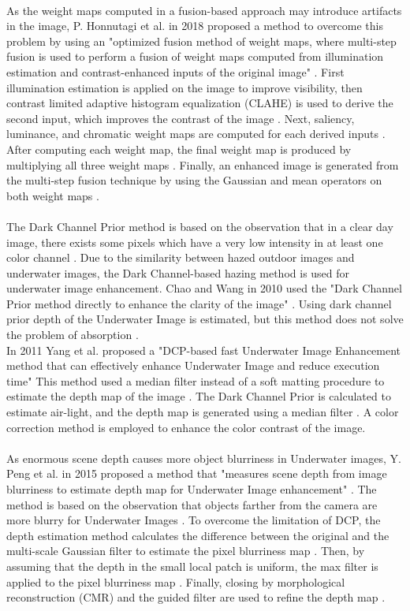 \documentclass[a4paper,11pt,oneside]{article}
\begin{document}
  \\
  As the weight maps computed in a fusion-based approach may introduce artifacts in the image, P. Honnutagi et al. in 2018 \cite{10} proposed a method to overcome this problem by using an "optimized fusion method of weight maps, where multi-step fusion is used to perform a fusion of weight maps computed from illumination estimation and contrast-enhanced inputs of the original image" \cite{10}. First illumination estimation is applied on the image to improve visibility, then contrast limited adaptive histogram equalization (CLAHE) is used to derive the second input, which improves the contrast of the image \cite{10}. Next, saliency, luminance, and chromatic weight maps are computed for each derived inputs \cite{10}. After computing each weight map, the final weight map is produced by multiplying all three weight maps \cite{10}. Finally, an enhanced image is generated from the multi-step fusion technique by using the Gaussian and mean operators on both weight maps \cite{10}.\\
  \\
  The Dark Channel Prior method is based on the observation that in a clear day image, there exists some pixels which have a very low intensity in at least one color channel \cite{15}. Due to the similarity between hazed outdoor images and underwater images, the Dark Channel-based hazing method is used for underwater image enhancement. Chao and Wang in 2010 \cite{25} used the "Dark Channel Prior method directly to enhance the clarity of the image" \cite{25}. Using dark channel prior depth of the Underwater Image is estimated, but this method does not solve the problem of absorption \cite{25}.\\
 In 2011 Yang et al. \cite{8} proposed a "DCP-based fast Underwater Image Enhancement method that can effectively enhance Underwater Image and reduce execution time" \cite{8} This method used a median filter instead of a soft matting procedure to estimate the depth map of the image \cite{8}. The Dark Channel Prior is calculated to estimate air-light, and the depth map is generated using a median filter \cite{8}. A color correction method is employed to enhance the color contrast of the image.\cite{8}\\
  \\
  As enormous scene depth causes more object blurriness in Underwater images, Y. Peng et al. in 2015 \cite{3} proposed a method that "measures scene depth from image blurriness to estimate depth map for Underwater Image enhancement" \cite{3}. The method is based on the observation that objects farther from the camera are more blurry for Underwater Images \cite{3}. To overcome the limitation of DCP, the depth estimation method calculates the difference between the original and the multi-scale Gaussian filter to estimate the pixel blurriness map \cite{3}. Then, by assuming that the depth in the small local patch is uniform, the max filter is applied to the pixel blurriness map \cite{3}. Finally, closing by morphological reconstruction (CMR) and the guided filter are used to refine the depth map \cite{3}.\\
\end{document}
